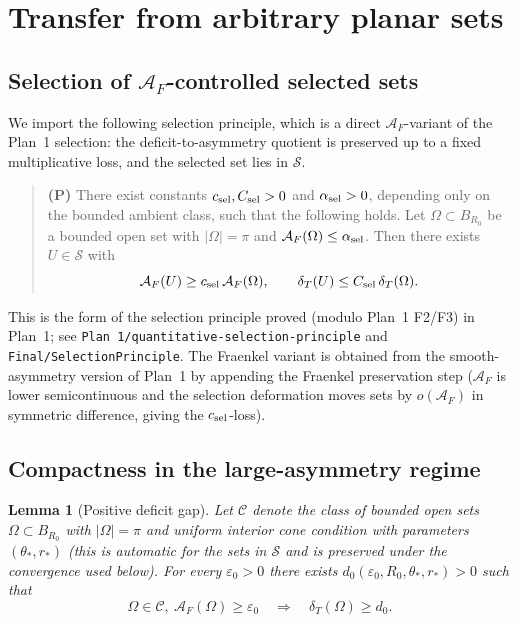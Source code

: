 \documentclass[11pt]{amsart}
\newtheorem{lemma}[theorem]{Lemma}
\newcommand{\dT}{\delta_T}
\newcommand{\AF}{\mathcal A_F}
\newcommand{\eps}{\varepsilon}
\newcommand{\Sclass}{\mathcal S}
\begin{document}
\section{Transfer from arbitrary planar sets}\label{sec:transfer}

\subsection{Selection of \(\AF\)-controlled selected sets}

We import the following selection principle, which is a direct
\(\AF\)-variant of the Plan~1 selection: the deficit-to-asymmetry
quotient is preserved up to a fixed multiplicative loss, and the
selected set lies in \(\Sclass\).

\begin{quote}
\textbf{(P)} There exist constants \(c_{\rm sel},C_{\rm sel}>0\) and
\(\alpha_{\rm sel}>0\), depending only on the bounded ambient class,
such that the following holds.  Let \(\Omega\subset B_{R_0}\) be a
bounded open set with \(|\Omega|=\pi\) and \(\AF(\Omega)\le
\alpha_{\rm sel}\).  Then there exists \(U\in\Sclass\) with
\begin{equation}\label{eq:selection}
   \AF(U)\ge c_{\rm sel}\,\AF(\Omega),
   \qquad
   \dT(U)\le C_{\rm sel}\,\dT(\Omega).
\end{equation}
\end{quote}

This is the form of the selection principle proved (modulo Plan~1
F2/F3) in Plan~1; see \texttt{Plan 1/quantitative-selection-principle}
and \texttt{Final/SelectionPrinciple}.  The Fraenkel variant is
obtained from the smooth-asymmetry version of Plan~1 by appending the
Fraenkel preservation step (\(\AF\) is lower semicontinuous and the
selection deformation moves sets by \(o(\AF)\) in symmetric difference,
giving the \(c_{\rm sel}\)-loss).

\subsection{Compactness in the large-asymmetry regime}

\begin{lemma}[Positive deficit gap]\label{lem:large-asymmetry}
Let \(\mathcal C\) denote the class of bounded open sets
\(\Omega\subset B_{R_0}\) with \(|\Omega|=\pi\) and uniform interior
cone condition with parameters \((\theta_*,r_*)\) (this is automatic
for the sets in \(\Sclass\) and is preserved under the convergence
used below).  For every \(\eps_0>0\) there exists
\(d_0(\eps_0,R_0,\theta_*,r_*)>0\) such that
\[
   \Omega\in\mathcal C,\ \AF(\Omega)\ge\eps_0\quad\Longrightarrow\quad
   \dT(\Omega)\ge d_0.
\]
\end{lemma}
\end{document}
